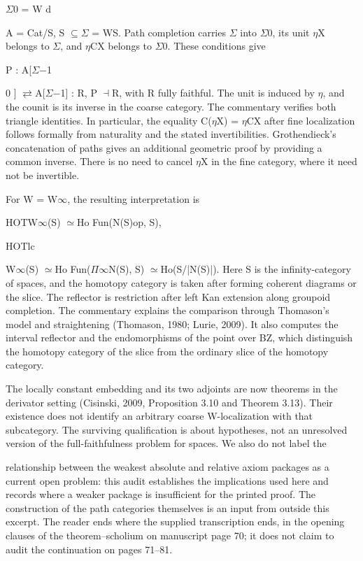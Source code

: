 \ensuremath{\Sigma}0 = W d


A = Cat/S, S \ensuremath{\subseteq}\ensuremath{\Sigma} = WS. Path completion carries \ensuremath{\Sigma} into \ensuremath{\Sigma}0, its unit \ensuremath{\eta}X belongs to \ensuremath{\Sigma}, and \ensuremath{\eta}CX belongs to \ensuremath{\Sigma}0. These conditions give


P : A[\ensuremath{\Sigma}\ensuremath{-}1


0 ] \ensuremath{\rightleftarrows}A[\ensuremath{\Sigma}\ensuremath{-}1] : R, P \ensuremath{\dashv}R, with R fully faithful. The unit is induced by \ensuremath{\eta}, and the counit is its inverse in the coarse category. The commentary verifies both triangle identities. In particular, the equality C(\ensuremath{\eta}X) = \ensuremath{\eta}CX after fine localization follows formally from naturality and the stated invertibilities. Grothendieck’s concatenation of paths gives an additional geometric proof by providing a common inverse. There is no need to cancel \ensuremath{\eta}X in the fine category, where it need not be invertible.


For W = W\ensuremath{\infty}, the resulting interpretation is


HOTW\ensuremath{\infty}(S) \ensuremath{\simeq}Ho Fun(N(S)op, S),


HOTlc


W\ensuremath{\infty}(S) \ensuremath{\simeq}Ho Fun(\ensuremath{\Pi}\ensuremath{\infty}N(S), S) \ensuremath{\simeq}Ho(S/|N(S)|). Here S is the infinity-category of spaces, and the homotopy category is taken after forming coherent diagrams or the slice. The reflector is restriction after left Kan extension along groupoid completion. The commentary explains the comparison through Thomason’s model and straightening (Thomason, 1980; Lurie, 2009). It also computes the interval reflector and the endomorphisms of the point over BZ, which distinguish the homotopy category of the slice from the ordinary slice of the homotopy category.


The locally constant embedding and its two adjoints are now theorems in the derivator setting (Cisinski, 2009, Proposition 3.10 and Theorem 3.13). Their existence does not identify an arbitrary coarse W-localization with that subcategory. The surviving qualification is about hypotheses, not an unresolved version of the full-faithfulness problem for spaces. We also do not label the


relationship between the weakest absolute and relative axiom packages as a current open problem: this audit establishes the implications used here and records where a weaker package is insufficient for the printed proof. The construction of the path categories themselves is an input from outside this excerpt. The reader ends where the supplied transcription ends, in the opening clauses of the theorem--scholium on manuscript page 70; it does not claim to audit the continuation on pages 71--81.

\nocite{*}
